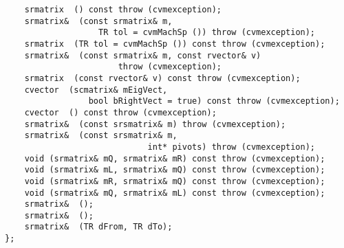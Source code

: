 \verb"    srmatrix "\verb" () const throw (cvmexception);"\\
\verb"    srmatrix& "\verb" (const srmatrix& m,"\\
\verb"                   TR tol = cvmMachSp ()) throw (cvmexception);"\\
\verb"    srmatrix "\verb" (TR tol = cvmMachSp ()) const throw (cvmexception);"\\
\verb"    srmatrix& "\verb" (const srmatrix& m, const rvector& v)"\\
\verb"                       throw (cvmexception);"\\
\verb"    srmatrix "\verb" (const rvector& v) const throw (cvmexception);"\\
\verb"    cvector "\verb" (scmatrix& mEigVect,"\\
\verb"                 bool bRightVect = true) const throw (cvmexception);"\\
\verb"    cvector "\verb" () const throw (cvmexception);"\\
\verb"    srmatrix& "\verb" (const srsmatrix& m) throw (cvmexception);"\\
\verb"    srmatrix& "\verb" (const srsmatrix& m,"\\
\verb"                             int* pivots) throw (cvmexception);"\\
\verb"    void "\verb"(srmatrix& mQ, srmatrix& mR) const throw (cvmexception);"\\
\verb"    void "\verb"(srmatrix& mL, srmatrix& mQ) const throw (cvmexception);"\\
\verb"    void "\verb"(srmatrix& mR, srmatrix& mQ) const throw (cvmexception);"\\
\verb"    void "\verb"(srmatrix& mQ, srmatrix& mL) const throw (cvmexception);"\\
\verb"    srmatrix& "\verb" ();"\\
\verb"    srmatrix& "\verb" ();"\\
\verb"    srmatrix& "\verb" (TR dFrom, TR dTo);"\\
\verb"};"
\newpage




